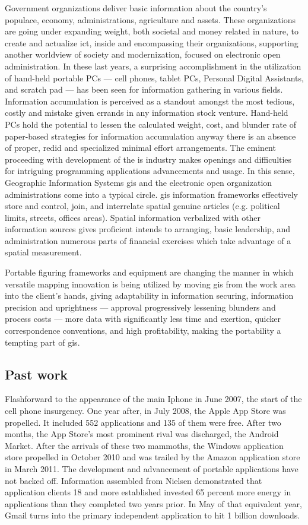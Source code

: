 Government organizations deliver basic information about the country's populace, economy, administrations, agriculture and assets. These organizations are going under expanding weight, both societal and money related in nature, to create and actualize \gls{ict}, inside and encompassing their organizations, supporting another worldview of society and modernization, focused on electronic open administration. In these last years, a surprising accomplishment in the utilization of hand-held portable PCs — cell phones, tablet PCs, Personal Digital Assistants, and scratch pad — has been seen for information gathering in various fields.
Information accumulation is perceived as a standout amongst the most tedious, costly and mistake given errands in any information stock venture. Hand-held PCs hold the potential to lessen the calculated weight, cost, and blunder rate of paper-based strategies for information accumulation anyway there is an absence of proper, redid and specialized minimal effort arrangements. The eminent proceeding with development of the \gls{is} industry makes openings and difficulties for intriguing programming applications advancements and usage. In this sense, Geographic Information Systems \gls{gis} and the electronic open organization administrations come into a typical circle. \gls{gis} information frameworks effectively store and control, join, and interrelate spatial genuine articles (e.g. political limits, streets, offices areas). Spatial information verbalized with other information sources gives proficient intends to arranging, basic leadership, and administration numerous parts of financial exercises which take advantage of a spatial measurement.

Portable figuring frameworks and equipment are changing the manner in which versatile mapping innovation is being utilized by moving \gls{gis} from the work area into the client's hands, giving adaptability in information securing, information precision and uprightness — approval progressively lessening blunders and process costs — more data with significantly less time and exertion, quicker correspondence conventions, and high profitability, making the portability a tempting part of \gls{gis}.

\subsection{Past work}

Flashforward to the appearance of the main Iphone in June 2007, the start of the cell phone insurgency. One year after, in July 2008, the Apple App Store was propelled. It included 552 applications and 135 of them were free. After two months, the App Store's most prominent rival was discharged, the Android Market. After the arrivals of these two mammoths, the Windows application store propelled in October 2010 and was trailed by the Amazon application store in March 2011. The development and advancement of portable applications have not backed off. Information assembled from Nielsen demonstrated that application clients 18 and more established invested 65 percent more energy in applications than they completed two years prior. In May of that equivalent year, Gmail turns into the primary independent application to hit 1 billion downloads.

